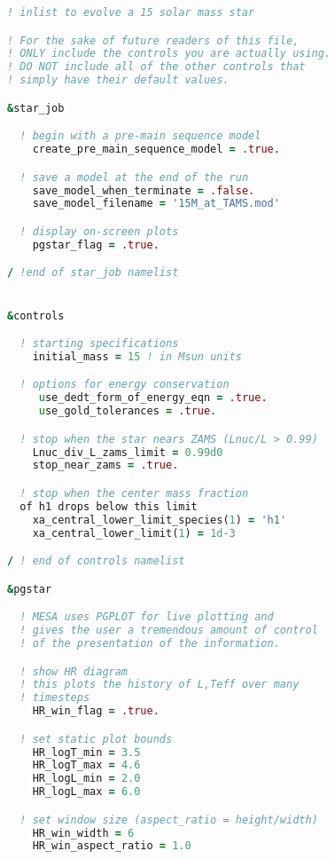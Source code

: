 \begin{landscape}

\begin{lstlisting}[language=Fortran,
caption = Example for a multi-column and multi-page code listing. 
\label{code:longListing},frame=T]
\end{lstlisting} 
\begin{lstlisting}[language=Fortran,multicols=2,frame=none]
! inlist to evolve a 15 solar mass star

! For the sake of future readers of this file,
! ONLY include the controls you are actually using. 
! DO NOT include all of the other controls that 
! simply have their default values.

&star_job

  ! begin with a pre-main sequence model
    create_pre_main_sequence_model = .true.

  ! save a model at the end of the run
    save_model_when_terminate = .false.
    save_model_filename = '15M_at_TAMS.mod'

  ! display on-screen plots
    pgstar_flag = .true.

/ !end of star_job namelist


&controls

  ! starting specifications
    initial_mass = 15 ! in Msun units

  ! options for energy conservation 
     use_dedt_form_of_energy_eqn = .true.
     use_gold_tolerances = .true.

  ! stop when the star nears ZAMS (Lnuc/L > 0.99)
    Lnuc_div_L_zams_limit = 0.99d0
    stop_near_zams = .true.

  ! stop when the center mass fraction
  of h1 drops below this limit
    xa_central_lower_limit_species(1) = 'h1'
    xa_central_lower_limit(1) = 1d-3

/ ! end of controls namelist

&pgstar

  ! MESA uses PGPLOT for live plotting and 
  ! gives the user a tremendous amount of control 
  ! of the presentation of the information.

  ! show HR diagram
  ! this plots the history of L,Teff over many 
  ! timesteps
    HR_win_flag = .true.

  ! set static plot bounds
    HR_logT_min = 3.5
    HR_logT_max = 4.6
    HR_logL_min = 2.0
    HR_logL_max = 6.0

  ! set window size (aspect_ratio = height/width)
    HR_win_width = 6
    HR_win_aspect_ratio = 1.0



\end{lstlisting}
\end{landscape}
